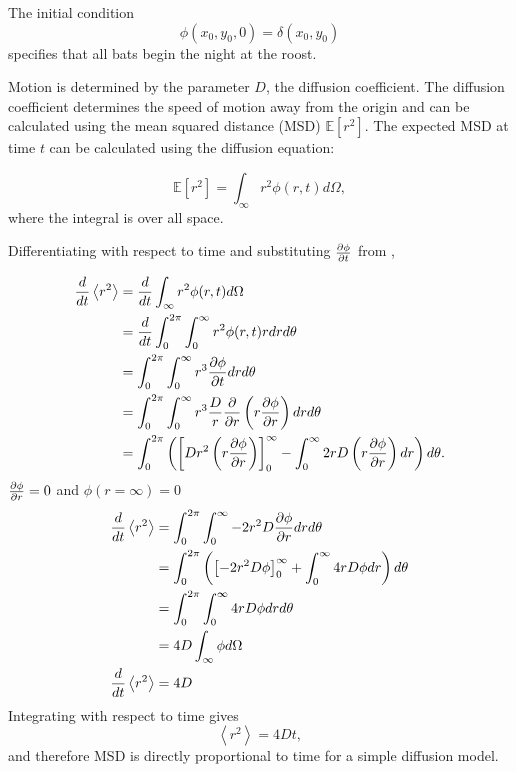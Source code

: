 The initial condition
%
\begin{equation}
\phi(x_0,y_0,0) = \delta(x_0,y_0)
\label{eqn:IC}
\end{equation}
%
specifies that all bats begin the night at the roost.

Motion is determined by the parameter $D$, the diffusion coefficient. The diffusion coefficient determines the speed of motion away from the origin and can be calculated using the mean squared distance (MSD) $\mathbb{E}[r^2]$. The expected MSD at time $t$ can be calculated using the diffusion equation:

\begin{equation}
\mathbb{E}[r^2] = \int_{\infty}r^2 \phi(r,t) d\Omega ,
\label{eqn:MSD_int}
\end{equation}
%
where the integral is over all space.

Differentiating  with respect to time and substituting $\frac{\partial \phi}{\partial t}$ from ,

\begin{equation}
\begin{split}
\frac{d}{dt} \left<r^2\right> &= \frac{d}{dt}\int_{\infty}r^2 \phi(r,t) d\Omega \\
                            &= \frac{d}{dt} \int_0^{2\pi}\int_0^{\infty} r^2 \phi(r,t) r dr d\theta \\
                           &= \int_0^{2\pi} \int_0^{\infty} r^3 \frac{\partial \phi}{\partial t} dr d\theta \\
                            &= \int_0^{2\pi} \int_0^{\infty} r^3 \frac{D}{r} \frac{\partial }{\partial r } \left( r \frac{\partial  \phi}{\partial  r}\right) dr d\theta \\
                            &= \int_0^{2\pi} \left( \left[ D r^2 \left( r \frac{\partial  \phi}{\partial  r}\right) \right]_0^{\infty} - \int_0^{\infty} 2rD \left(r \frac{\partial \phi}{\partial r} \right) dr \right) d\theta. \\
\label{eqn:diffusion_1}
\end{split}
\end{equation}
%
$\frac{\partial \phi}{\partial r} = 0$ and $\phi(r=\infty)=0$
%
\begin{equation}
\begin{split}
\frac{d}{dt} \left<r^2\right> &= \int_0^{2\pi} \int_0^{\infty} -2r^2D \frac{\partial  \phi}{\partial r}dr d\theta \\
                            &= \int_0^{2\pi} \left( \left[-2r^2D \phi \right]_0^{\infty} + \int_0^{\infty} 4rD \phi dr \right)d\theta \\
                            &= \int_0^{2\pi} \int_0^{\infty} 4rD\phi dr d\theta \\
                            &= 4D \int_{\infty} \phi d\Omega \\
\frac{d}{dt} \left<r^2\right>  &= 4D \\
\label{eqn:diffusion_1}
\end{split}
\end{equation}
Integrating with respect to time gives
%
\begin{equation}
\left<r^2\right> = 4Dt ,
\label{eqn:D_msd}
\end{equation}
%
and therefore MSD is directly proportional to time for a simple diffusion model.

